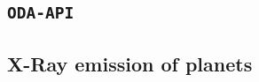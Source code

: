 \begin{figure}[H]
\begin{subfigure}{.45\textwidth}
        \end{subfigure}
        \caption{}
        \label{jemx}
        \end{figure}
    

    \subsection{\texttt{ODA-API}}
    \subsection{X-Ray emission of planets}
